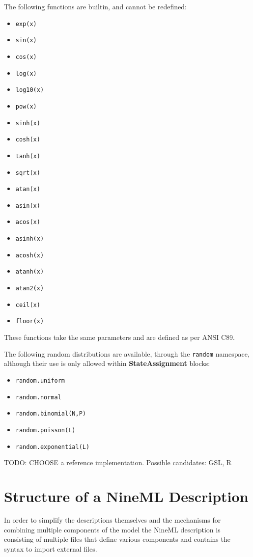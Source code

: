 \documentclass{article}
\newcommand{\StateAssignment}{{\bf{StateAssignment}}\xspace}
\begin{document}
The following functions are builtin, and cannot be redefined:
\begin{itemize}
\item \verb|exp(x)|
\item \verb|sin(x)|
\item \verb|cos(x)|
\item \verb|log(x)|
\item \verb|log10(x)|
\item \verb|pow(x)|
\item \verb|sinh(x)|
\item \verb|cosh(x)|
\item \verb|tanh(x)|
\item \verb|sqrt(x)|
\item \verb|atan(x)|
\item \verb|asin(x)|
\item \verb|acos(x)|
\item \verb|asinh(x)|
\item \verb|acosh(x)|
\item \verb|atanh(x)|
\item \verb|atan2(x)|
\item \verb|ceil(x)|
\item \verb|floor(x)|
\end{itemize}

These functions take the same parameters and are defined as per ANSI C89.

The following random distributions are available, through the \verb|random| namespace,
although their use is only allowed within \StateAssignment blocks:

\begin{itemize}
\item \verb|random.uniform|
\item \verb|random.normal|
\item \verb|random.binomial(N,P)|
\item \verb|random.poisson(L)|
\item \verb|random.exponential(L)|
\end{itemize}

TODO: CHOOSE a reference implementation. Possible candidates: GSL, R

\pagebreak

\section{Structure of a NineML Description}

In order to simplify the descriptions themselves and the mechanisms for
combining multiple components of the model the NineML description
is consisting of multiple files that define various components and
contains the syntax to import external files.
\end{document}
